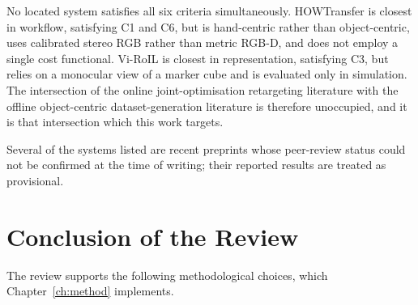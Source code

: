 No located system satisfies all six criteria simultaneously. HOWTransfer
\cite{howtransfer} is closest in workflow, satisfying C1 and C6, but is
hand-centric rather than object-centric, uses calibrated stereo RGB rather than
metric RGB-D, and does not employ a single cost functional. Vi-RoIL
\cite{viroil} is closest in representation, satisfying C3, but relies on a
monocular view of a marker cube and is evaluated only in simulation. The
intersection of the online joint-optimisation retargeting literature with the
offline object-centric dataset-generation literature is therefore unoccupied,
and it is that intersection which this work targets.

Several of the systems listed are recent preprints
\cite{howtransfer, robopaint, shadowing, dexcanvas} whose peer-review status
could not be confirmed at the time of writing; their reported results are
treated as provisional.

\section{Conclusion of the Review}
\label{sec:lit-conclusion}

The review supports the following methodological choices, which
Chapter~\ref{ch:method} implements.

